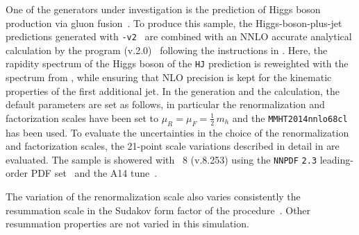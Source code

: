 \subsubsection{\Powheg \NNLOPS}
\label{sec:hjetscomp:tools:nnlops:powheg}

One of the generators under investigation is the \NNLOPS prediction 
of Higgs boson production via gluon fusion~\cite{Hamilton:2013fea}.
To produce this sample, the Higgs-boson-plus-jet \Minlo~\cite{Hamilton:2012np} 
predictions generated with \PowhegBox{}\texttt{-v2}~\cite{Campbell:2012am} 
are combined with an NNLO accurate analytical calculation by the 
program \HNNLO (v.2.0)~\cite{Catani:2007vq,Grazzini:2008tf,Grazzini:2013mca} 
following the instructions in \cite{Hamilton:2013fea}. Here, the rapidity 
spectrum of the Higgs boson of the \Powheg \texttt{HJ} \Minlo prediction 
is reweighted with the spectrum from \HNNLO, while ensuring that NLO 
precision is kept for the kinematic properties of the first additional jet. 
In the generation and the \HNNLO calculation, the default parameters are 
set as follows, in particular the renormalization and factorization scales 
have been set to $\mu_R = \mu_F = \tfrac{1}{2}\,m_h$ and the 
\texttt{MMHT2014nnlo68cl} \cite{Harland-Lang:2014zoa} has been used. 
To evaluate the uncertainties in the choice of the renormalization and 
factorization scales, the 21-point scale variations described in detail 
in \cite{Hamilton:2013fea} are evaluated.
The \NNLOPS sample is showered with \Pythia~8 (v.8.253) \cite{Sjostrand:2014zea} 
using the \texttt{NNPDF} \texttt{2.3} leading-order PDF set~\cite{Ball:2012cx} 
and the A14 tune~\cite{ATL-PHYS-PUB-2014-021}. 

The variation of the renormalization scale also varies consistently the 
resummation scale in the Sudakov form factor of the \Minlo 
procedure~\cite{Hamilton:2012rf}. Other resummation properties are not 
varied in this simulation. 

